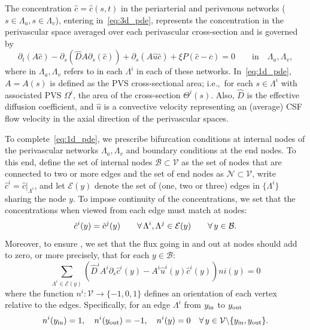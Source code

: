 The concentration $\hat{c} = \hat{c}(s, t)$ in the periarterial and
perivenous networks ($s \in \Lambda_a, s \in \Lambda_v$), entering
in~\eqref{eq:3d_pde}, represents the concentration in the perivascular
space averaged over each perivascular cross-section and is governed by 
\begin{equation}
  \partial_t (A  \hat c) - \partial_s( \hat D A \partial_s (\hat c) ) + \partial_s(A \hat u \hat c )  +  \xi P (\hat c - \overline{c}) = 0
  \qquad \text{in} \quad \Lambda_a, \Lambda_v ,
\label{eq:1d_pde}
\end{equation}
where in $\Lambda_a, \Lambda_v$ refers to in each $\Lambda^i$ in each
of these networks. In~\eqref{eq:1d_pde}, $A = A(s)$ is defined as the
PVS cross-sectional area; i.e.,~for each $s \in \Lambda^i$ with
associated PVS $\Omega^i$, the area of the cross-section
$\Theta^i(s)$. Also, $\hat{D}$ is the effective diffusion coefficient,
and $\hat{u}$ is a convective velocity representing an (average) CSF
flow velocity in the axial direction of the perivascular spaces.

To complete~\eqref{eq:1d_pde}, we prescribe bifurcation conditions at
internal nodes of the perivascular networks $\Lambda_a, \Lambda_v$ and
boundary conditions at the end nodes. To this end, define the set of
internal nodes $\mathcal{B} \subset \mathcal{V}$ as the set of nodes
that are connected to two or more edges and the set of end nodes as
$\mathcal{N} \subset \mathcal{V}$, write $\hat{c}^i =
\hat{c}|_{\Lambda^i}$, and let $\mathcal{E}(y)$ denote the set of
(one, two or three) edges in $\{\Lambda^i\}$ sharing the node $y$. To
impose continuity of the concentrations, we set that the
concentrations when viewed from each edge must match at nodes:
\begin{equation}
  \hat{c}^i (y) = \hat{c}^j(y)
  \qquad \forall \, \Lambda^i, \Lambda^j \in \mathcal{E}(y)
  \qquad \forall \, y \in \mathcal{B} .
  \label{eq:conc_continuity}
\end{equation}
Moreover, to ensure , we set that the flux
going in and out at nodes should add to zero, or more precisely, that
for each $y \in \mathcal{B}$:
\begin{equation}
  \sum_{\Lambda^i \in \mathcal{E}(y)}
  \left (\hat{D}^i A^i \partial_s \hat{c}^i (y) - A^i \hat u^i(y) \hat{c}^i(y) \right ) ni(y)
  = 0
  \label{eq:flux_conservation}
\end{equation}
where the function $n^i : \mathcal{V} \rightarrow \{-1, 0, 1\}$
defines an orientation of each vertex relative to the
edges. Specifically, for an edge $\Lambda^i$ from $y_{\rm in}$ to $y_{\rm out}$
\begin{equation}
  n^i(y_{\rm in}) = 1, \quad
  n^i(y_{\rm{out}}) = -1, \quad
  n^i(y) = 0 \quad \forall \, y \in 
  \mathcal{V} \backslash \{ y_{\rm in}, y_{\rm out} \} .  
  \label{eq:def:sign}
\end{equation}

